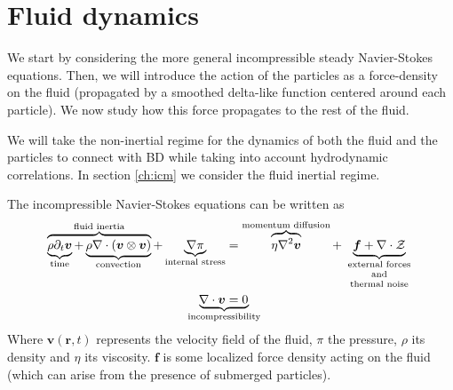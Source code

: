 \documentclass[twoside,openright,titlepage,numbers=noenddot,%
headinclude,footinclude,cleardoublepage=empty,abstract=on,
BCOR=5mm,fontsize=11pt, dvipsnames, paper=b5
]{scrreprt}
\renewcommand{\vec}[1]{\bm{#1}}
\newcommand{\fpos}{r}
\newcommand{\fvel}{v}
\begin{document}
\section*{Fluid dynamics}
We start by considering the more general incompressible steady Navier-Stokes equations. Then, we will introduce the action of the particles as a force-density on the fluid (propagated by a smoothed delta-like function centered around each particle). We now study how this force propagates to the rest of the fluid.

We will take the non-inertial regime for the dynamics of both the fluid and the particles to connect with \gls{BD} while taking into account hydrodynamic correlations. In section \ref{ch:icm} we consider the fluid inertial regime.

The incompressible Navier-Stokes equations can be written as~\cite{Balboa2014}
\begin{equation}
  \label{eq:navierstokes}
  \begin{aligned}
    \overbrace{\underbrace{\rho\partial_t{\vec{\fvel}}}_{\text{time}} +\underbrace{\rho\nabla\cdot (\vec{\fvel}\otimes\vec{\fvel})}_{\text{convection}}}^{\text{fluid inertia}} + \underbrace{\nabla \pi}_{\text{internal stress}} &= \overbrace{\eta \nabla^2\vec{\fvel}}^{\text{momentum diffusion}} + \underbrace{\vec{f} + \nabla\cdot \mathcal{Z}}_{\text{\parbox{2cm}{\centering external forces\\[-4pt] and\\[-4pt] thermal noise}}}\\
    \nabla\cdot\vec{\fvel} &= 0\quad\mathllap{\underbrace{\phantom{\nabla\cdot\vec{\fvel} = 0}}_{\text{incompressibility}}}
  \end{aligned}
\end{equation}
Where $\vec{\fvel}(\vec{\fpos}, t)$ represents the velocity field of the fluid, $\pi$ the pressure, $\rho$ its density and $\eta$ its viscosity. $\vec{f}$ is some localized force density acting on the fluid (which can arise from the presence of submerged particles).
\end{document}
